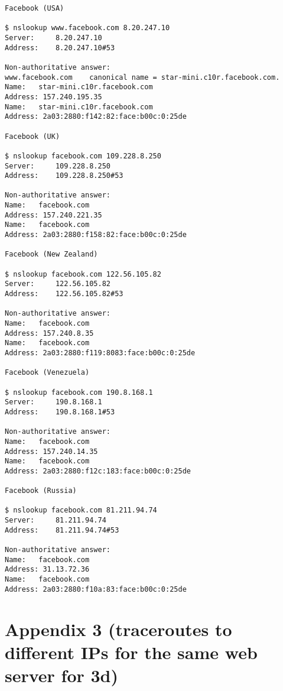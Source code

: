 \documentclass[a4paper]{article}
\begin{document}
\begin{lstlisting}
Facebook (USA)

$ nslookup www.facebook.com 8.20.247.10
Server:		8.20.247.10
Address:	8.20.247.10#53

Non-authoritative answer:
www.facebook.com	canonical name = star-mini.c10r.facebook.com.
Name:	star-mini.c10r.facebook.com
Address: 157.240.195.35
Name:	star-mini.c10r.facebook.com
Address: 2a03:2880:f142:82:face:b00c:0:25de

Facebook (UK)

$ nslookup facebook.com 109.228.8.250
Server:		109.228.8.250
Address:	109.228.8.250#53

Non-authoritative answer:
Name:	facebook.com
Address: 157.240.221.35
Name:	facebook.com
Address: 2a03:2880:f158:82:face:b00c:0:25de

Facebook (New Zealand)

$ nslookup facebook.com 122.56.105.82
Server:		122.56.105.82
Address:	122.56.105.82#53

Non-authoritative answer:
Name:	facebook.com
Address: 157.240.8.35
Name:	facebook.com
Address: 2a03:2880:f119:8083:face:b00c:0:25de

Facebook (Venezuela)

$ nslookup facebook.com 190.8.168.1
Server:		190.8.168.1
Address:	190.8.168.1#53

Non-authoritative answer:
Name:	facebook.com
Address: 157.240.14.35
Name:	facebook.com
Address: 2a03:2880:f12c:183:face:b00c:0:25de

Facebook (Russia)

$ nslookup facebook.com 81.211.94.74
Server:		81.211.94.74
Address:	81.211.94.74#53

Non-authoritative answer:
Name:	facebook.com
Address: 31.13.72.36
Name:	facebook.com
Address: 2a03:2880:f10a:83:face:b00c:0:25de

\end{lstlisting}

\section{Appendix 3 (traceroutes to different IPs for the same web server for 3d)}
\end{document}
